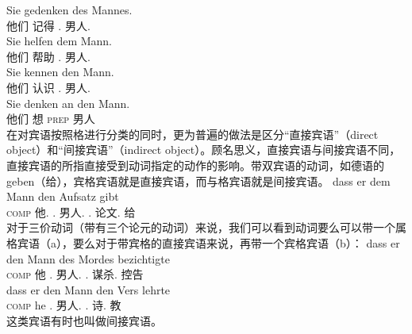 \eal
\ex 
\gll Sie gedenken des Mannes.\\
	 他们 记得 .\gen{} 男人.\gen{}\\
\ex 
\gll Sie helfen dem Mann.\\
	 他们 帮助 .\dat{} 男人.\dat{}\\
\ex 
\gll Sie kennen den Mann.\\
	 他们 认识 .\acc{} 男人.\acc{}\\
\ex 
\gll Sie denken an den Mann.\\
	 他们 想 \textsc{prep}  男人\\
\zl
在对宾语按照格进行分类的同时，更为普遍的做法是区分“直接宾语”（direct object）和“间接宾语”（indirect object）。顾名思义，直接宾语与间接宾语不同，直接宾语的所指直接受到动词指定的动作的影响。带双宾语的动词，如德语的geben（给），宾格宾语就是直接宾语，而与格宾语就是间接宾语。
\ea
\gll dass er dem Mann den Aufsatz gibt\\
	 \textsc{comp} 他.\nom{} .\dat{} 男人.\dat{} .\acc{} 论文.\acc{} 给\\
\z
对于三价动词（带有三个论元的动词）来说，我们可以看到动词要么可以带一个属格宾语（a），要么对于带宾格的直接宾语来说，再带一个宾格宾语（b）：
\addlines
\eal
\ex 
\gll dass er den Mann des Mordes bezichtigte\\
	 \textsc{comp} 他 .\acc{} 男人.\acc{} .\gen{} 谋杀.\gen{} 控告\\
\ex 
\gll dass er den Mann den Vers lehrte\\
	 \textsc{comp} he .\acc{} 男人.\acc{} .\acc{} 诗.\acc{} 教\\
\zl
这类宾语有时也叫做间接宾语。

